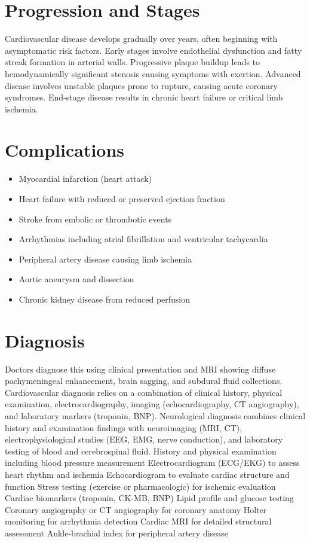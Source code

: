 \section{Progression and Stages}
Cardiovascular disease develops gradually over years, often beginning with asymptomatic risk factors. Early stages involve endothelial dysfunction and fatty streak formation in arterial walls. Progressive plaque buildup leads to hemodynamically significant stenosis causing symptoms with exertion. Advanced disease involves unstable plaques prone to rupture, causing acute coronary syndromes. End-stage disease results in chronic heart failure or critical limb ischemia.
\section{Complications}
\begin{itemize}[noitemsep]
  \item Myocardial infarction (heart attack)
  \item Heart failure with reduced or preserved ejection fraction
  \item Stroke from embolic or thrombotic events
  \item Arrhythmias including atrial fibrillation and ventricular tachycardia
  \item Peripheral artery disease causing limb ischemia
  \item Aortic aneurysm and dissection
  \item Chronic kidney disease from reduced perfusion
\end{itemize}
\section{Diagnosis}
Doctors diagnose this using clinical presentation and MRI showing diffuse pachymeningeal enhancement, brain sagging, and subdural fluid collections. Cardiovascular diagnosis relies on a combination of clinical history, physical examination, electrocardiography, imaging (echocardiography, CT angiography), and laboratory markers (troponin, BNP). Neurological diagnosis combines clinical history and examination findings with neuroimaging (MRI, CT), electrophysiological studies (EEG, EMG, nerve conduction), and laboratory testing of blood and cerebrospinal fluid. History and physical examination including blood pressure measurement Electrocardiogram (ECG/EKG) to assess heart rhythm and ischemia Echocardiogram to evaluate cardiac structure and function Stress testing (exercise or pharmacologic) for ischemic evaluation Cardiac biomarkers (troponin, CK-MB, BNP) Lipid profile and glucose testing Coronary angiography or CT angiography for coronary anatomy Holter monitoring for arrhythmia detection Cardiac MRI for detailed structural assessment Ankle-brachial index for peripheral artery disease

